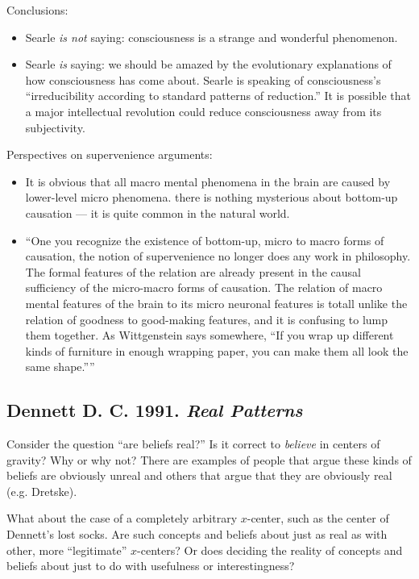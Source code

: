 \documentclass{article}
\newcommand{\ti}[1]{\textit{#1}}
\newcommand{\annbibtitle}[2]{\subsection*{#1. \ti{#2}}}
\begin{document}
Conclusions:
\begin{itemize}
\item Searle \ti{is not} saying: consciousness is a strange and wonderful phenomenon.
\item Searle \ti{is} saying: we should be amazed by the evolutionary explanations of how consciousness has come about. Searle is speaking of consciousness's ``irreducibility according to standard patterns of reduction.'' It is possible that a major intellectual revolution could reduce consciousness away from its subjectivity.
\end{itemize}

Perspectives on supervenience arguments:
\begin{itemize}
\item It is obvious that all macro mental phenomena in the brain are caused by lower-level micro phenomena. there is nothing mysterious about bottom-up causation --- it is quite common in the natural world.
\item ``One you recognize the existence of bottom-up, micro to macro forms of causation, the notion of supervenience no longer does any work in philosophy. The formal features of the relation are already present in the causal sufficiency of the micro-macro forms of causation. The relation of macro mental features of the brain to its micro neuronal features is totall unlike the relation of goodness to good-making features, and it is confusing to lump them together. As Wittgenstein says somewhere, ``If you wrap up different kinds of furniture in enough wrapping paper, you can make them all look the same shape.''''
\end{itemize}



\annbibtitle{Dennett D. C. 1991}{Real Patterns}

Consider the question ``are beliefs real?'' Is it correct to \ti{believe} in centers of gravity? Why or why not? There are examples of people that argue these kinds of beliefs are obviously unreal and others that argue that they are obviously real (e.g. Dretske).

What about the case of a completely arbitrary $x$-center, such as the center of Dennett's lost socks. Are such concepts and beliefs about just as real as with other, more ``legitimate'' $x$-centers? Or does deciding the reality of concepts and beliefs about just to do with usefulness or interestingness?
\end{document}
